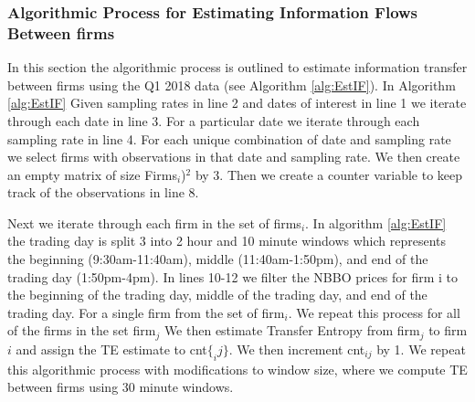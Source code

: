 \subsubsection{Algorithmic Process for Estimating Information Flows Between firms}

In this section the algorithmic process is outlined to estimate information transfer between firms using the Q1 2018 data (see Algorithm \ref{alg:EstIF}). In Algorithm \ref{alg:EstIF} Given sampling rates in line 2 and dates of interest  in line 1 we iterate through each date in line 3. For a particular date we iterate through each sampling rate in line 4. For each unique combination of date and sampling rate we select firms with observations in that date and sampling rate. We then create an empty matrix of size Firms\(_i\))\(^2\) by 3.  Then we create a counter variable to keep track of the observations in line 8. 

Next we iterate through each firm in the set of firms\(_i\).  In algorithm \ref{alg:EstIF} the trading day is split 3 into 2 hour and 10 minute windows which represents the beginning (9:30am-11:40am),  middle (11:40am-1:50pm),  and end of the trading day (1:50pm-4pm).  In lines 10-12 we filter the NBBO prices for firm i to the beginning of the trading day,  middle of the trading day, and end of the trading day.  For a single firm from the set of firm\(_i\). We repeat this process for all of the firms in the set firm\(_j\) We then estimate Transfer Entropy from firm\(_j\) to firm\(i\)  and assign the TE estimate to cnt\(\{_ij\}\). We then increment cnt\(_{ij}\) by 1.  We repeat this algorithmic process with modifications to window size, where we compute TE between firms using 30 minute windows.\\

